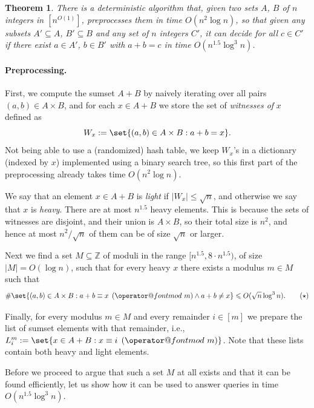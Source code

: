 \documentclass[10pt,a4paper]{article}
\makeatletter
\newtheorem{theorem}{Theorem}[section]
\newcommand{\tpmod}[1]{\mkern 8mu({\operator@font mod}\mkern 6mu#1)}
\makeatother
\begin{document}
\begin{theorem}\label{thm:unknowncdet}
    There is a deterministic algorithm that, given two sets $A$, $B$ of $n$ integers in $[n^{O(1)}]$, preprocesses them in time $O(n^2 \log n)$, so that given any subsets $A' \subseteq A$, $B' \subseteq B$ and any set of $n$ integers $C'$, it can decide for all $c \in C'$ if there exist $a \in A'$, $b \in B'$ with $a+b=c$ in time $O(n^{1.5} \log^3 n)$.
\end{theorem}

\paragraph{Preprocessing.}

First, we compute the sumset $A+B$ by naively iterating over all pairs $(a,b) \in A \times B$, and for each $x \in A+B$ we store the set of \emph{witnesses of} $x$ defined as
\[W_x := \set{ (a, b) \in A \times B : a + b = x}.\]
Not being able to use a (randomized) hash table, we keep $W_x$'s in a dictionary (indexed by $x$) implemented using a binary search tree, so this first part of the preprocessing already takes time $O(n^2 \log n)$.

We say that an element $x \in A+B$ is \emph{light} if $|W_x| \leqslant \sqrt{n}$, and otherwise we say that $x$ is \emph{heavy}. There are at most $n^{1.5}$ heavy elements.
This is because the sets of witnesses are disjoint, and their union is $A \times B$, so their total size is $n^2$, and hence at most $n^2/\sqrt{n}$ of them can be of size $\sqrt{n}$ or larger.

Next we find a set $M \subseteq \mathbb{Z}$ of moduli in the range $[n^{1.5}, 8 \cdot n^{1.5})$, of size $|M|=O(\log n)$, such that for every heavy $x$ there exists a modulus $m \in M$ such that
\[\#\set{(a,b) \in A \times B : a + b \equiv x \tpmod{m} \land a+b \neq x} \leqslant O(\sqrt{n} \log^3 n). \tag{$\star$}\]

Finally, for every modulus $m \in M$ and every remainder $i \in [m]$ we prepare the list of sumset elements with that remainder, i.e., $L^m_i := \set{x \in A+B : x \equiv i \tpmod{m}}$. Note that these lists contain both heavy and light elements.

Before we proceed to argue that such a set $M$ at all exists and that it can be found efficiently, let us show how it can be used to answer queries in time $O(n^{1.5} \log^3 n)$.
\end{document}
